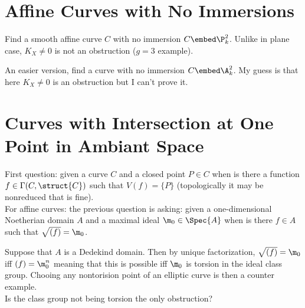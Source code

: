 \documentclass[12pt]{article}
\begin{document}
\section{Affine Curves with No Immersions}

\begin{exercise}
Find a smooth affine curve $C$ with no immersion $C \embed \P^2_k$. Unlike in plane case, $K_X \neq 0$ is not an obstruction ($g = 3$ example). 
\end{exercise}

\begin{exercise}
An easier version, find a curve with no immersion $C \embed \A^2_k$. My guess is that here $K_X \neq 0$ is an obstruction but I can't prove it.
\end{exercise}

\section{Curves with Intersection at One Point in Ambiant Space}

\begin{exercise}
First question: given a curve $C$ and a closed point $P \in C$ when is there a function $f \in \Gamma(C, \struct{C})$ such that $V(f) = \{ P \}$ (topologically it may be nonreduced that is fine). 
\bigskip\\
For affine curves: the previous question is asking: given a one-dimensional Noetherian domain $A$ and a maximal ideal $\m_0 \in \Spec{A}$ when is there $f \in A$ such that $\sqrt{(f)} = \m_0$. 
\end{exercise}

Suppose that $A$ is a Dedekind domain. Then by unique factorization, $\sqrt{(f)} = \m_0$ iff $(f) = \m_0^n$ meaning that this is possible iff $\m_0$ is torsion in the ideal class group. Chooing any nontorision point of an elliptic curve is then a counter example.
\bigskip\\
Is the class group not being torsion the only obstruction?
\end{document}
